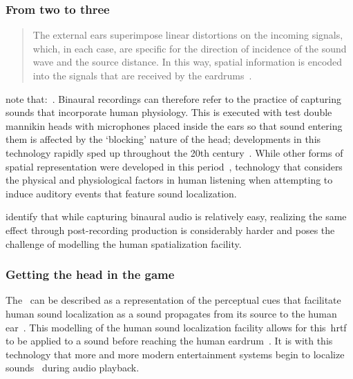\subsubsection{From two to three}

\begin{quotation}
    The external ears superimpose linear distortions on the incoming signals, which, in each case, are specific for the direction of incidence of the sound wave and the source distance.
    In this way, spatial information is encoded into the signals that are received by the eardrums~\citep{blauert_spatial}.
\end{quotation}

\citet{roginska2017immersive} note that:~.
Binaural recordings can therefore refer to the practice of capturing sounds that incorporate human physiology.
This is executed with test double mannikin heads with microphones placed inside the ears so that sound entering them is affected by the `blocking' nature of the head;
developments in this technology rapidly sped up throughout the 20th century~\citep{binaural_paul}.
While other forms of spatial representation were developed in this period~\citep{gerzon_periphony, noisternig_ambisonic, wave_field}, technology that considers the physical and physiological factors in human listening when attempting to induce auditory events that feature sound localization.

\citet{roginska2017immersive} identify that while capturing binaural audio is relatively easy, realizing the same effect through post-recording production is considerably harder and poses the challenge of modelling the human spatialization facility.

\subsubsection{Getting the head in the game}

The~ can be described as a representation of the perceptual cues that facilitate human sound localization as a sound propagates from its source to the human ear~\citep{Suzuki2011}.
This modelling of the human sound localization facility allows for this~\gls{hrtf} to be applied to a sound before reaching the human eardrum~\citep{roginska2017immersive}.
It is with this technology that more and more modern entertainment systems begin to localize sounds~\citep{blauert_spatial, HONDA2007, roginska2017immersive, Suzuki2011, Xie2013, ps5_audio, soundscape_design} during audio playback.

